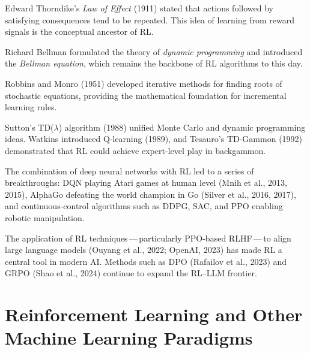 \begin{description}[leftmargin=!,labelwidth=3.2cm]
\item[Psychology (1900s--1950s)]
Edward Thorndike's \emph{Law of Effect} (1911) stated that actions followed by satisfying consequences tend to be repeated.  This idea of learning from reward signals is the conceptual ancestor of RL.

\item[Optimal control (1950s)]
Richard Bellman formulated the theory of \emph{dynamic programming} and introduced the \emph{Bellman equation}, which remains the backbone of RL algorithms to this day.

\item[Stochastic approximation]
Robbins and Monro (1951) developed iterative methods for finding roots of stochastic equations, providing the mathematical foundation for incremental learning rules.

\item[Temporal-difference learning (1980s--1990s)]
Sutton's TD($\lambda$) algorithm (1988) unified Monte Carlo and dynamic programming ideas.  Watkins introduced Q-learning (1989), and Tesauro's TD-Gammon (1992) demonstrated that RL could achieve expert-level play in backgammon.

\item[Deep RL (2013--present)]
The combination of deep neural networks with RL led to a series of breakthroughs: DQN playing Atari games at human level (Mnih et al., 2013, 2015), AlphaGo defeating the world champion in Go (Silver et al., 2016, 2017), and continuous-control algorithms such as DDPG, SAC, and PPO enabling robotic manipulation.

\item[RL for language models (2020--present)]
The application of RL techniques\,---\,particularly PPO-based RLHF\,---\,to align large language models (Ouyang et al., 2022; OpenAI, 2023) has made RL a central tool in modern AI.  Methods such as DPO (Rafailov et al., 2023) and GRPO (Shao et al., 2024) continue to expand the RL--LLM frontier.
\end{description}


\section{Reinforcement Learning and Other Machine Learning Paradigms}
\label{sec:rl-vs-ml}

